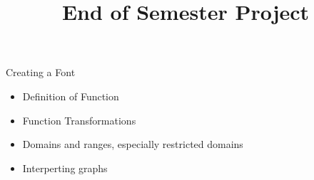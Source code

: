 \documentclass{ximera}
\author{}
\title{End of Semester Project}
\begin{document}
\begin{abstract}
\end{abstract}
\maketitle


\begin{objectives}

\item Creating a Font
\begin{itemize}
	\item Definition of Function
	\item Function Transformations
	\item Domains and ranges, especially restricted domains
	\item Interperting graphs
\end{itemize}



\end{objectives}
\end{document}
